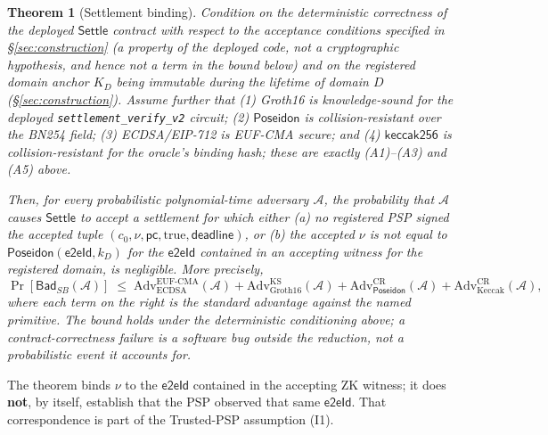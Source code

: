 \documentclass[11pt]{article}
\newtheorem{theorem}{Theorem}
\newcommand{\Poseidon}{\ensuremath{\mathsf{Poseidon}}}
\newcommand{\eeid}{\ensuremath{\mathsf{e2eId}}}
\newcommand{\code}[1]{\texttt{#1}}
\begin{document}
\begin{theorem}[Settlement binding]
\label{thm:settlementbinding}
Condition on the deterministic correctness of the deployed $\mathsf{Settle}$
contract with respect to the acceptance conditions specified in
\S\ref{sec:construction} (a property of the deployed code, not a cryptographic
hypothesis, and hence not a term in the bound below) and on the registered
domain anchor $K_D$ being immutable during the lifetime of domain $D$
(\S\ref{sec:construction}). Assume further that (1) Groth16 is knowledge-sound
for the deployed \code{settlement\_verify\_v2} circuit; (2) $\Poseidon$ is
collision-resistant over the BN254 field; (3) ECDSA/EIP-712 is EUF-CMA secure;
and (4) $\mathsf{keccak256}$ is collision-resistant for the oracle's binding
hash; these are exactly (A1)--(A3) and (A5) above.

Then, for every probabilistic polynomial-time adversary $\mathcal{A}$, the
probability that $\mathcal{A}$ causes $\mathsf{Settle}$ to accept a settlement
for which either (a) no registered PSP signed the accepted tuple
$(c_0,\nu,\mathsf{pc},\mathrm{true},\mathsf{deadline})$, or (b) the accepted
$\nu$ is not equal to $\Poseidon(\eeid,k_D)$ for the \eeid{} contained in an
accepting witness for the registered domain, is negligible. More precisely,
\begin{equation}
\Pr[\mathsf{Bad}_{SB}(\mathcal{A})]
\;\leq\;
\mathrm{Adv}^{\mathrm{EUF\text{-}CMA}}_{\mathrm{ECDSA}}(\mathcal{A})
+\mathrm{Adv}^{\mathrm{KS}}_{\mathrm{Groth16}}(\mathcal{A})
+\mathrm{Adv}^{\mathrm{CR}}_{\Poseidon}(\mathcal{A})
+\mathrm{Adv}^{\mathrm{CR}}_{\mathrm{Keccak}}(\mathcal{A}),
\end{equation}
where each term on the right is the standard advantage against the named
primitive. The bound holds under the deterministic conditioning above; a
contract-correctness failure is a software bug outside the reduction, not a
probabilistic event it accounts for.
\end{theorem}

\noindent The theorem binds $\nu$ to the \eeid{} contained in the accepting ZK
witness; it does \textbf{not}, by itself, establish that the PSP observed that
same \eeid{}. That correspondence is part of the Trusted-PSP assumption (I1).
\end{document}
